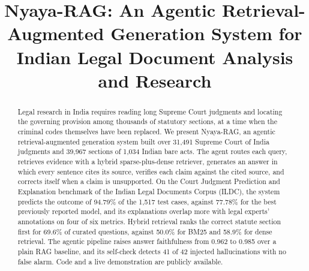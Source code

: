 \documentclass[conference]{IEEEtran}
\begin{document}
\title{Nyaya-RAG: An Agentic Retrieval-Augmented Generation System for Indian Legal Document Analysis and Research}

\author{
\and
{}
\and
{}
}

\maketitle

\begin{abstract}
Legal research in India requires reading long Supreme Court judgments and locating the governing provision among thousands of statutory sections, at a time when the criminal codes themselves have been replaced. We present Nyaya-RAG, an agentic retrieval-augmented generation system built over 31,491 Supreme Court of India judgments and 39,967 sections of 1,034 Indian bare acts. The agent routes each query, retrieves evidence with a hybrid sparse-plus-dense retriever, generates an answer in which every sentence cites its source, verifies each claim against the cited source, and corrects itself when a claim is unsupported. On the Court Judgment Prediction and Explanation benchmark of the Indian Legal Documents Corpus (ILDC), the system predicts the outcome of 94.79\% of the 1,517 test cases, against 77.78\% for the best previously reported model, and its explanations overlap more with legal experts' annotations on four of six metrics. Hybrid retrieval ranks the correct statute section first for 69.6\% of curated questions, against 50.0\% for BM25 and 58.9\% for dense retrieval. The agentic pipeline raises answer faithfulness from 0.962 to 0.985 over a plain RAG baseline, and its self-check detects 41 of 42 injected hallucinations with no false alarm. Code and a live demonstration are publicly available.
\end{abstract}
\end{document}
